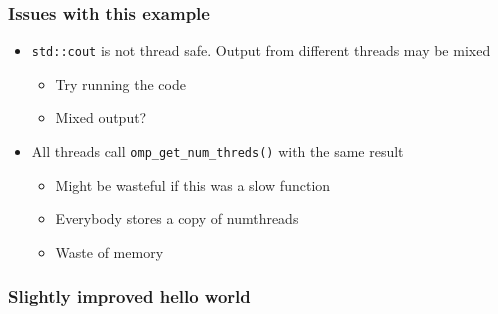 \subsubsection{Issues with this example}\label{issues-with-this-example}

\begin{itemize}
\itemsep1pt\parskip0pt
\item
  \texttt{std::cout} is not thread safe. Output from different threads
  may be mixed

  \begin{itemize}
  \itemsep1pt\parskip0pt
  \item
    Try running the code
  \item
    Mixed output?
  \end{itemize}
\item
  All threads call \texttt{omp\_get\_num\_threds()} with the same result

  \begin{itemize}
  \itemsep1pt\parskip0pt
  \item
    Might be wasteful if this was a slow function
  \item
    Everybody stores a copy of numthreads
  \item
    Waste of memory
  \end{itemize}
\end{itemize}

\subsubsection{Slightly improved hello
world}\label{slightly-improved-hello-world}

\begin{Shaded}
\begin{Highlighting}[]

   
\NormalTok{\{}
     \NormalTok{;}
     \NormalTok{;}
    \NormalTok{\{   }
            \NormalTok{\{}
            \NormalTok{\}}
        \NormalTok{\{}
             
                 
        \NormalTok{\}}
    \NormalTok{\}}
\NormalTok{\}}
\end{Highlighting}
\end{Shaded}

